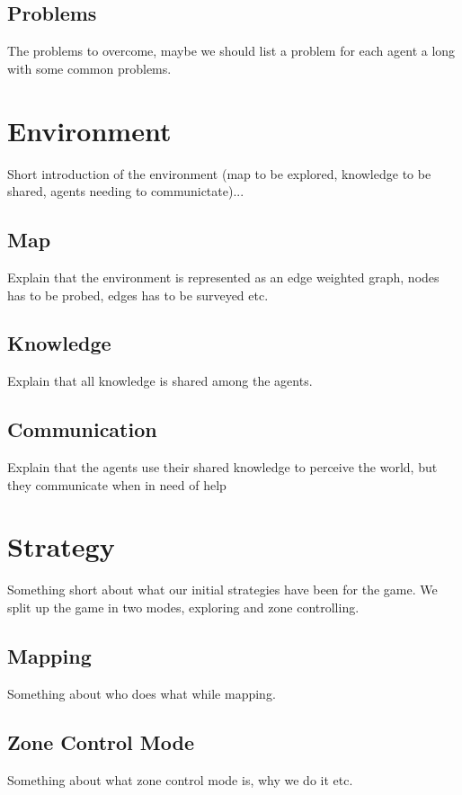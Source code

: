 \documentclass[11pt]{article}
\begin{document}
\subsection{Problems}
The problems to overcome, maybe we should list a problem for each agent a long with some common problems.

\section{Environment}
Short introduction of the environment (map to be explored, knowledge to be shared, agents needing to communictate)...

\subsection{Map}
Explain that the environment is represented as an edge weighted graph, nodes has to be probed, edges has to be surveyed etc.

\subsection{Knowledge}
Explain that all knowledge is shared among the agents.

\subsection{Communication}
Explain that the agents use their shared knowledge to perceive the world, but they communicate when in need of help

\section{Strategy}
Something short about what our initial strategies have been for the game. We split up the game in two modes, exploring and zone controlling.

\subsection{Mapping}
Something about who does what while mapping.

\subsection{Zone Control Mode}
Something about what zone control mode is, why we do it etc.
\end{document}
